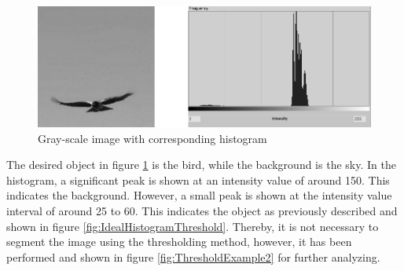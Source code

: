\begin{figure}[H]
	\centering
	\includegraphics[width=1\textwidth]{8Misc/Pictures/Introduction/img_threshold_1.jpg}
	\caption{Gray-scale image with corresponding histogram}
	\label{fig:ThresholdExample1}
\end{figure}

The desired object in figure \ref{fig:ThresholdExample1} is the bird, while the background is the sky. In the histogram, a significant peak is shown at an intensity value of around 150. This indicates the background. However, a small peak is shown at the intensity value interval of around 25 to 60. This indicates the object as previously described and shown in figure \ref{fig:IdealHistogramThreshold}. Thereby, it is not necessary to segment the image using the thresholding method, however, it has been performed and shown in figure \ref{fig:ThresholdExample2} for further analyzing. 

